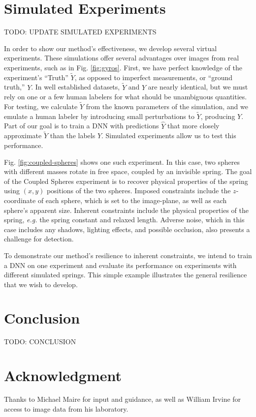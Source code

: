 \documentclass[10pt, journal]{IEEEtran}
\begin{document}
\section{Simulated Experiments}
\label{sec:simulated-experiments}

TODO: UPDATE SIMULATED EXPERIMENTS

In order to show our method's effectiveness, we develop several virtual
experiments. These simulations offer several advantages over images from real
experiments, such as in Fig. \ref{fig:gyros}. First, we have perfect knowledge
of the experiment's ``Truth'' $\tilde{Y}$, as opposed to imperfect measurements,
or ``ground truth,'' $Y$. In well established datasets, $\tilde{Y}$ and $Y$ are
nearly identical, but we must rely on one or a few human labelers for what
should be unambiguous quantities. For testing, we calculate $\tilde{Y}$ from the
known parameters of the simulation, and we emulate a human labeler by
introducing small perturbations to $\tilde{Y}$, producing $Y$. Part of
our goal is to train a DNN with predictions $\hat{Y}$ that more closely
approximate $\tilde{Y}$ than the labels $Y$. Simulated experiments allow us to
test this performance.

Fig. \ref{fig:coupled-spheres} shows one such experiment. In this case, two
spheres with different masses rotate in free space, coupled by an invisible
spring. The goal of the Coupled Spheres experiment is to recover physical
properties of the spring using $(x,y)$ positions of the two spheres. Imposed
constraints include the $z$-coordinate of each sphere, which is set to the
image-plane, as well as each sphere's apparent size. Inherent constraints
include the physical properties of the spring, \textit{e.g.} the spring constant
and relaxed length. Adverse noise, which in this case includes any shadows,
lighting effects, and possible occlusion, also presents a challenge for
detection.

To demonstrate our method's resilience to inherent constraints, we intend to
train a DNN on one experiment and evaluate its performance on experiments with
different simulated springs. This simple example illustrates the general
resilience that we wish to develop.

\section{Conclusion}
\label{sec:conclusion}

TODO: CONCLUSION

\section*{Acknowledgment}
\label{sec:acknowledgment}

Thanks to Michael Maire for input and guidance, as well as William Irvine for
access to image data from his laboratory.



\end{document}
